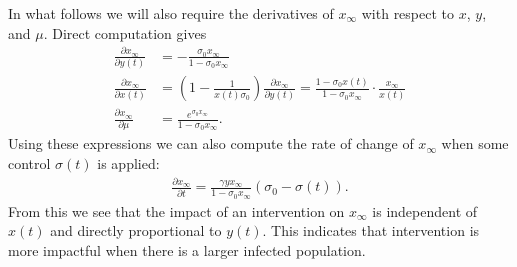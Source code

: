 \documentclass[english,12pt,letter]{article}
\newcommand{\Rnot}{\sigma_0}
\newcommand{\Sinf}{x_\infty}
\newcommand{\dom}{{\mathcal D}}
\begin{document}
In what follows we will also require the derivatives of $\Sinf$ with respect to $x$, $y$, and $\mu$.
Direct computation gives
\begin{subequations} \label{xinf-grad}
\begin{align}
    \frac{\partial \Sinf}{\partial y(t)} & = -\frac{\Rnot \Sinf}{1-\Rnot \Sinf} \\
    \frac{\partial \Sinf}{\partial x(t)} & = \left(1-\frac{1}{x(t)\Rnot}\right) \frac{\partial \Sinf}{\partial y(t)}
      = \frac{1-\Rnot x(t)}{1-\Rnot \Sinf} \cdot \frac{\Sinf}{x(t)} \\
    \frac{\partial \Sinf}{\partial \mu} & = \frac{e^{\Rnot\Sinf}}{1-\Rnot \Sinf}.
\end{align}
\end{subequations}
Using these expressions we can also compute the rate of change of $\Sinf$ when some
control $\sigma(t)$ is applied:
\begin{align} \label{dxinf-dt}
    \frac{\partial \Sinf}{\partial t} = \frac{\gamma y \Sinf}{1-\Rnot\Sinf}(\Rnot - \sigma(t)).
\end{align}
From this we see that the impact of an intervention on $\Sinf$ is independent of $x(t)$ and
directly proportional to $y(t)$.  This indicates that intervention is more impactful
when there is a larger infected population.
%
%


\end{document}
